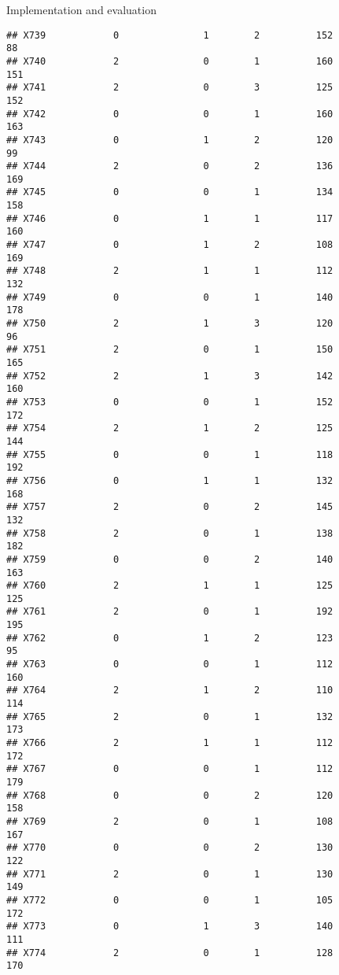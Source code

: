 \documentclass[
  ignorenonframetext,
]{beamer}
\begin{document}
\begin{frame}[fragile]{Implementation and evaluation}
\begin{verbatim}
## X739            0               1        2          152             88
## X740            2               0        1          160            151
## X741            2               0        3          125            152
## X742            0               0        1          160            163
## X743            0               1        2          120             99
## X744            2               0        2          136            169
## X745            0               0        1          134            158
## X746            0               1        1          117            160
## X747            0               1        2          108            169
## X748            2               1        1          112            132
## X749            0               0        1          140            178
## X750            2               1        3          120             96
## X751            2               0        1          150            165
## X752            2               1        3          142            160
## X753            0               0        1          152            172
## X754            2               1        2          125            144
## X755            0               0        1          118            192
## X756            0               1        1          132            168
## X757            2               0        2          145            132
## X758            2               0        1          138            182
## X759            0               0        2          140            163
## X760            2               1        1          125            125
## X761            2               0        1          192            195
## X762            0               1        2          123             95
## X763            0               0        1          112            160
## X764            2               1        2          110            114
## X765            2               0        1          132            173
## X766            2               1        1          112            172
## X767            0               0        1          112            179
## X768            0               0        2          120            158
## X769            2               0        1          108            167
## X770            0               0        2          130            122
## X771            2               0        1          130            149
## X772            0               0        1          105            172
## X773            0               1        3          140            111
## X774            2               0        1          128            170

\end{verbatim}
\end{frame}
\end{document}
